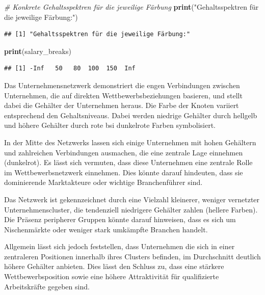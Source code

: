 \documentclass[
]{article}
\newenvironment{Shaded}{\begin{snugshade}}{\end{snugshade}}
\newcommand{\CommentTok}[1]{\textcolor[rgb]{0.56,0.35,0.01}{\textit{#1}}}
\newcommand{\FunctionTok}[1]{\textcolor[rgb]{0.13,0.29,0.53}{\textbf{#1}}}
\newcommand{\NormalTok}[1]{#1}
\newcommand{\StringTok}[1]{\textcolor[rgb]{0.31,0.60,0.02}{#1}}
\begin{document}
\begin{Shaded}
\begin{Highlighting}[]
\CommentTok{\# Konkrete Gehaltsspektren für die jeweilige Färbung}
\FunctionTok{print}\NormalTok{(}\StringTok{"Gehaltsspektren für die jeweilige Färbung:"}\NormalTok{)}
\end{Highlighting}
\end{Shaded}

\begin{verbatim}
## [1] "Gehaltsspektren für die jeweilige Färbung:"
\end{verbatim}

\begin{Shaded}
\begin{Highlighting}[]
\FunctionTok{print}\NormalTok{(salary\_breaks)}
\end{Highlighting}
\end{Shaded}

\begin{verbatim}
## [1] -Inf   50   80  100  150  Inf
\end{verbatim}

Das Unternehmensnetzwerk demonstriert die engen Verbindungen zwischen
Unternehmen, die auf direkten Wettbewerbsbeziehungen basieren, und
stellt dabei die Gehälter der Unternehmen heraus. Die Farbe der Knoten
variiert entsprechend den Gehaltsniveaus. Dabei werden niedrige Gehälter
durch hellgelb und höhere Gehälter durch rote bsi dunkelrote Farben
symbolisiert.

In der Mitte des Netzwerks lassen sich einige Unternehmen mit hohen
Gehältern und zahlreichen Verbindungen ausmachen, die eine zentrale Lage
einnehmen (dunkelrot). Es lässt sich vermuten, dass diese Unternehmen
eine zentrale Rolle im Wettbewerbsnetzwerk einnehmen. Dies könnte darauf
hindeuten, dass sie dominierende Marktakteure oder wichtige
Branchenführer sind.

Das Netzwerk ist gekennzeichnet durch eine Vielzahl kleinerer, weniger
vernetzter Unternehmenscluster, die tendenziell niedrigere Gehälter
zahlen (hellere Farben). Die Präsenz peripherer Gruppen könnte darauf
hinweisen, dass es sich um Nischenmärkte oder weniger stark umkämpfte
Branchen handelt.

Allgemein lässt sich jedoch feststellen, dass Unternehmen die sich in
einer zentraleren Positionen innerhalb ihres Clusters befinden, im
Durchschnitt deutlich höhere Gehälter anbieten. Dies lässt den Schluss
zu, dass eine stärkere Wettbewerbsposition sowie eine höhere
Attraktivität für qualifizierte Arbeitskräfte gegeben sind.
\end{document}
